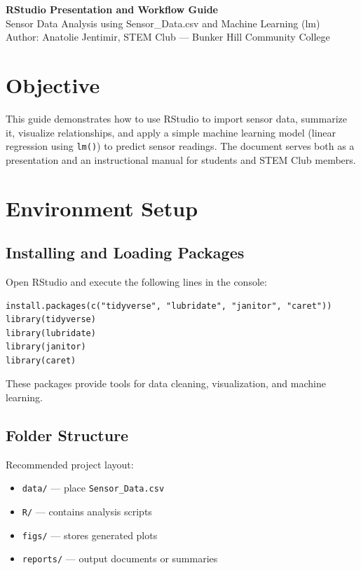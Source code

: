 \documentclass[12pt]{article}
\begin{document}
\begin{center}
  {\LARGE \textbf{RStudio Presentation and Workflow Guide}}\\[6pt]
  {\large Sensor Data Analysis using Sensor\_Data.csv and Machine Learning (lm)}\\[2pt]
  {\normalsize Author: Anatolie Jentimir, STEM Club — Bunker Hill Community College}
\end{center}

\vspace{1em}

\section*{Objective}
This guide demonstrates how to use RStudio to import sensor data, summarize it, visualize relationships, and apply a simple machine learning model (linear regression using \texttt{lm()}) to predict sensor readings. The document serves both as a presentation and an instructional manual for students and STEM Club members.

\section{Environment Setup}
\subsection{Installing and Loading Packages}
Open RStudio and execute the following lines in the console:

\begin{lstlisting}
install.packages(c("tidyverse", "lubridate", "janitor", "caret"))
library(tidyverse)
library(lubridate)
library(janitor)
library(caret)
\end{lstlisting}

These packages provide tools for data cleaning, visualization, and machine learning.

\subsection{Folder Structure}
Recommended project layout:
\begin{itemize}
  \item \texttt{data/} — place \texttt{Sensor\_Data.csv}
  \item \texttt{R/} — contains analysis scripts
  \item \texttt{figs/} — stores generated plots
  \item \texttt{reports/} — output documents or summaries
\end{itemize}
\end{document}
